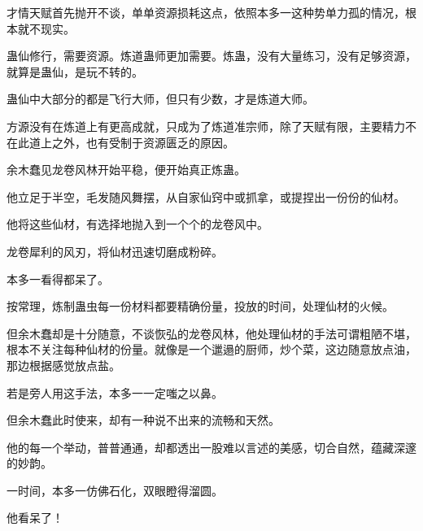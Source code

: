 \begin{this_body}
才情天赋首先抛开不谈，单单资源损耗这点，依照本多一这种势单力孤的情况，根本就不现实。

蛊仙修行，需要资源。炼道蛊师更加需要。炼蛊，没有大量练习，没有足够资源，就算是蛊仙，是玩不转的。

蛊仙中大部分的都是飞行大师，但只有少数，才是炼道大师。

方源没有在炼道上有更高成就，只成为了炼道准宗师，除了天赋有限，主要精力不在此道上之外，也有受制于资源匮乏的原因。

余木蠢见龙卷风林开始平稳，便开始真正炼蛊。

他立足于半空，毛发随风舞摆，从自家仙窍中或抓拿，或提捏出一份份的仙材。

他将这些仙材，有选择地抛入到一个个的龙卷风中。

龙卷犀利的风刃，将仙材迅速切磨成粉碎。

本多一看得都呆了。

按常理，炼制蛊虫每一份材料都要精确份量，投放的时间，处理仙材的火候。

但余木蠢却是十分随意，不谈恢弘的龙卷风林，他处理仙材的手法可谓粗陋不堪，根本不关注每种仙材的份量。就像是一个邋遢的厨师，炒个菜，这边随意放点油，那边根据感觉放点盐。

若是旁人用这手法，本多一一定嗤之以鼻。

但余木蠢此时使来，却有一种说不出来的流畅和天然。

他的每一个举动，普普通通，却都透出一股难以言述的美感，切合自然，蕴藏深邃的妙韵。

一时间，本多一仿佛石化，双眼瞪得溜圆。

他看呆了！

\end{this_body}

